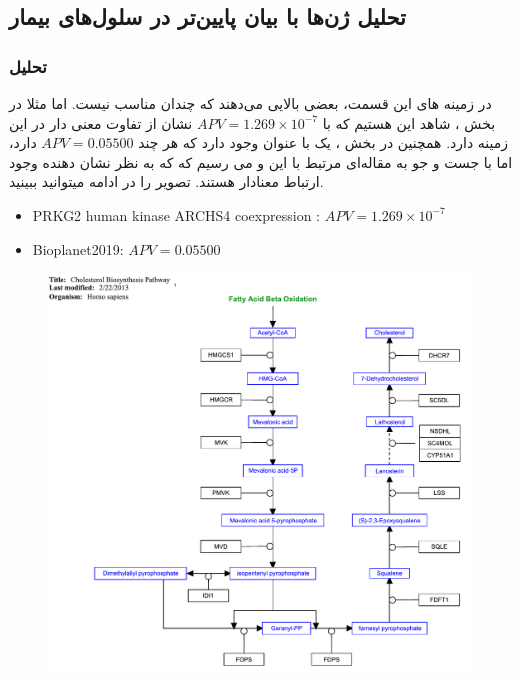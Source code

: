 \documentclass[12pt]{article}
\begin{document}
\subsection{تحلیل ژن‌ها با بیان پایین‌تر در سلول‌های بیمار}
\subsubsection{تحلیل }

در زمینه  های این قسمت، بعضی  بالایی می‌دهند که چندان مناسب نیست. اما مثلا در بخش ، شاهد این هستیم که  با $APV =1.269 \times 10^{-7}$ نشان از تفاوت معنی دار در این زمینه دارد. همچنین در بخش ، یک  با عنوان  وجود دارد که هر چند $APV=0.05500$ دارد، اما با جست و جو به مقاله‌ای مرتبط با این  و  می رسیم که که به نظر نشان دهنده وجود ارتباط معنادار هستند. تصویر  را در ادامه میتوانید ببینید. \cite{LI20033628}

\begin{latin}
	\begin{itemize}
		\item  {PRKG2 human kinase ARCHS4 coexpression} : $APV =1.269 \times 10^{-7}$
		
		\item  {Bioplanet2019}: $APV=0.05500$
	\end{itemize}
\end{latin}

\begin{figure}[h!]
	\centering	
	\includegraphics[width = 1.0 \textwidth ]{./Results/path4.pdf}
	\caption{}
	\label{fig:heat}
\end{figure}
\end{document}
